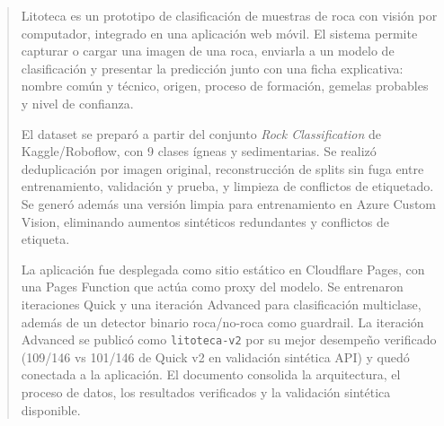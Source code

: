 \documentclass[a4paper,12pt]{article}
\begin{document}
  \begin{abstract}
    \noindent Litoteca es un prototipo de clasificación de muestras de roca con visión por
    computador, integrado en una aplicación web móvil. El sistema permite capturar
    o cargar una imagen de una roca, enviarla a un modelo de clasificación y
    presentar la predicción junto con una ficha explicativa: nombre común y técnico,
    origen, proceso de formación, gemelas probables y nivel de confianza.

    El dataset se preparó a partir del conjunto \emph{Rock Classification} de
    Kaggle/Roboflow, con 9 clases ígneas y sedimentarias. Se realizó deduplicación
    por imagen original, reconstrucción de splits sin fuga entre entrenamiento,
    validación y prueba, y limpieza de conflictos de etiquetado. Se generó además
    una versión limpia para entrenamiento en Azure Custom Vision, eliminando
    aumentos sintéticos redundantes y conflictos de etiqueta.

    La aplicación fue desplegada como sitio estático en Cloudflare Pages, con una
    Pages Function que actúa como proxy del modelo. Se entrenaron iteraciones Quick
    y una iteración Advanced para clasificación multiclase, además de un detector
    binario roca/no-roca como guardrail. La iteración Advanced se publicó como
    \texttt{litoteca-v2} por su mejor desempeño verificado (109/146 vs 101/146 de
    Quick v2 en validación sintética API) y quedó conectada a la aplicación. El
    documento consolida la arquitectura, el proceso de datos, los resultados
    verificados y la validación sintética disponible.
  \end{abstract}

  \clearpage
  \tableofcontents
  \clearpage


  
  
  
  
  

  \clearpage
  
  

  \appendix
  
\end{document}
